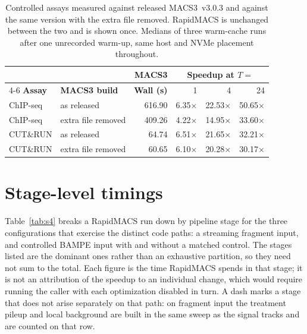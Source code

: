 \documentclass[10pt]{article}
\begin{document}
\begin{table}[h]
\centering
\small
\caption{Controlled assays measured against released MACS3~v3.0.3 and against the same version with the extra file removed. RapidMACS is unchanged between the two and is shown once. Medians of three warm-cache runs after one unrecorded warm-up, same host and NVMe placement throughout.\label{tab:s5}}
\begin{tabular}{@{}llrrrr@{}}
\toprule
& & \textbf{MACS3} & \multicolumn{3}{c}{\textbf{Speedup at $T=$}} \\
\cmidrule(lr){4-6}
\textbf{Assay} & \textbf{MACS3 build} & \textbf{Wall (s)} & 1 & 4 & 24 \\
\midrule
ChIP-seq & as released      & 616.90 & 6.35$\times$ & 22.53$\times$ & 50.65$\times$ \\
ChIP-seq & extra file removed & 409.26 & 4.22$\times$ & 14.95$\times$ & 33.60$\times$ \\
\addlinespace
CUT\&RUN & as released      &  64.74 & 6.51$\times$ & 21.65$\times$ & 32.21$\times$ \\
CUT\&RUN & extra file removed &  60.65 & 6.10$\times$ & 20.28$\times$ & 30.17$\times$ \\
\bottomrule
\end{tabular}
\end{table}

\section{Stage-level timings}
Table~\ref{tab:s4} breaks a RapidMACS run down by pipeline stage for the three configurations that exercise the distinct code paths: a streaming fragment input, and controlled BAMPE input with and without a matched control. The stages listed are the dominant ones rather than an exhaustive partition, so they need not sum to the total. Each figure is the time RapidMACS spends in that stage; it is not an attribution of the speedup to an individual change, which would require running the caller with each optimization disabled in turn. A dash marks a stage that does not arise separately on that path: on fragment input the treatment pileup and local background are built in the same sweep as the signal tracks and are counted on that row.
\end{document}
